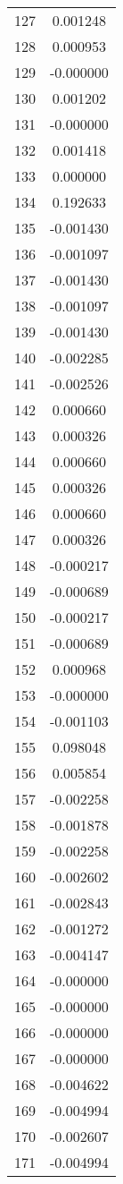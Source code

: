 \documentclass[12pt]{article}
\begin{document}
\begin{longtable}{@{}cc@{}}
127 & 0.001248 \\
128 & 0.000953 \\
129 & -0.000000 \\
130 & 0.001202 \\
131 & -0.000000 \\
132 & 0.001418 \\
133 & 0.000000 \\
134 & 0.192633 \\
135 & -0.001430 \\
136 & -0.001097 \\
137 & -0.001430 \\
138 & -0.001097 \\
139 & -0.001430 \\
140 & -0.002285 \\
141 & -0.002526 \\
142 & 0.000660 \\
143 & 0.000326 \\
144 & 0.000660 \\
145 & 0.000326 \\
146 & 0.000660 \\
147 & 0.000326 \\
148 & -0.000217 \\
149 & -0.000689 \\
150 & -0.000217 \\
151 & -0.000689 \\
152 & 0.000968 \\
153 & -0.000000 \\
154 & -0.001103 \\
155 & 0.098048 \\
156 & 0.005854 \\
157 & -0.002258 \\
158 & -0.001878 \\
159 & -0.002258 \\
160 & -0.002602 \\
161 & -0.002843 \\
162 & -0.001272 \\
163 & -0.004147 \\
164 & -0.000000 \\
165 & -0.000000 \\
166 & -0.000000 \\
167 & -0.000000 \\
168 & -0.004622 \\
169 & -0.004994 \\
170 & -0.002607 \\
171 & -0.004994 \\

\end{longtable}
\end{document}
